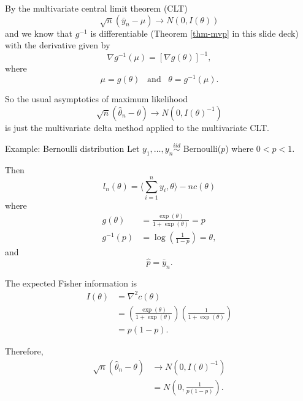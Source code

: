\documentclass[
  ignorenonframetext,
]{beamer}
\begin{document}
\begin{frame}{}
\protect\hypertarget{section-4}{}
By the multivariate central limit theorem (CLT) \[
  \sqrt{n}\left(\bar y_n - \mu\right) \to N\left(0, I(\theta)\right)
\] and we know that \(g^{-1}\) is differentiable (Theorem \ref{thm-mvp}
in this slide deck) with the derivative given by \[
  \nabla g^{-1}(\mu) = \left[\nabla g(\theta)\right]^{-1},
\] where \[
  \mu = g(\theta) \;\;\; \text{and} \;\;\; \theta = g^{-1}(\mu).
\]
\end{frame}

\begin{frame}{}
\protect\hypertarget{section-5}{}
So the usual asymptotics of maximum likelihood
\begin{equation} \label{asymptoticsMLE}
    \sqrt{n}\left(\hat\theta_n - \theta\right) \to N\left(0, I(\theta)^{-1}\right)
\end{equation} is just the multivariate delta method applied to the
multivariate CLT.
\end{frame}

\begin{frame}{Example: Bernoulli distribution}
\protect\hypertarget{example-bernoulli-distribution}{}
Let \(y_1,\ldots,y_n \overset{iid}{\sim}\) Bernoulli(\(p\)) where
\(0 < p < 1\).

Then \[
  l_n(\theta) = \langle\sum_{i=1}^n y_i,\theta\rangle - n c(\theta)
\] where \begin{align*}
  g(\theta) &= \frac{\exp(\theta)}{1 + \exp(\theta)} = p \\
  g^{-1}(p) &= \log\left(\frac{1}{1-p}\right) = \theta,
\end{align*} and \[
  \hat{p} = \bar{y}_n.
\]
\end{frame}

\begin{frame}{}
\protect\hypertarget{section-6}{}
The expected Fisher information is \begin{align*}
  I(\theta) &= \nabla^2 c(\theta) \\
    &= \left(\frac{\exp(\theta)}{1 + \exp(\theta)}\right)\left(\frac{1}{1 + \exp(\theta)}\right) \\
    &= p(1-p).
\end{align*}

Therefore, \begin{align*}
 \sqrt{n}\left(\hat{\theta}_n - \theta\right) &\to N\left(0,  I(\theta)^{-1}\right) \\
   &= N\left(0,  \frac{1}{p(1-p)}\right).
\end{align*}
\end{frame}
\end{document}
